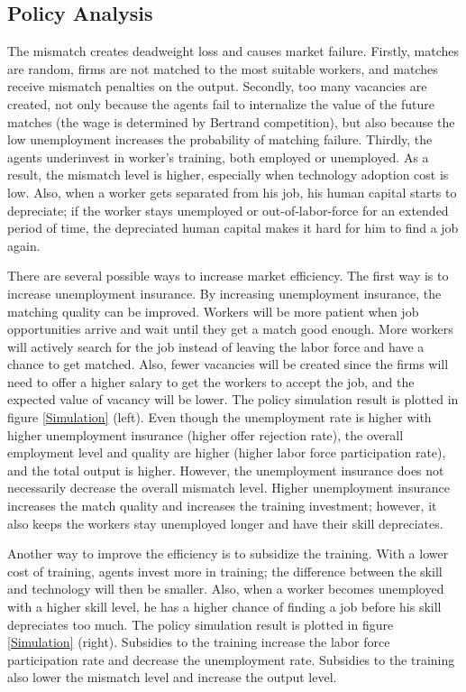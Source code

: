 \documentclass[12pt]{article}
\newcommand{\1}{\mathbb{1}}
\begin{document}
\subsection{Policy Analysis}
The mismatch creates deadweight loss and causes market failure. Firstly, matches are random, firms are not matched to the most suitable workers, and matches receive mismatch penalties on the output. Secondly, too many vacancies are created, not only because the agents fail to internalize the value of the future matches (the wage is determined by Bertrand competition), but also because the low unemployment increases the probability of matching failure. Thirdly, the agents underinvest in worker's training, both employed or unemployed. As a result, the mismatch level is higher, especially when technology adoption cost is low. Also, when a worker gets separated from his job, his human capital starts to depreciate; if the worker stays unemployed or out-of-labor-force for an extended period of time, the depreciated human capital makes it hard for him to find a job again. 

There are several possible ways to increase market efficiency. The first way is to increase unemployment insurance. By increasing unemployment insurance, the matching quality can be improved. Workers will be more patient when job opportunities arrive and wait until they get a match good enough. More workers will actively search for the job instead of leaving the labor force and have a chance to get matched. Also, fewer vacancies will be created since the firms will need to offer a higher salary to get the workers to accept the job, and the expected value of vacancy will be lower. The policy simulation result is plotted in figure \ref{Simulation} (left). Even though the unemployment rate is higher with higher unemployment insurance (higher offer rejection rate), the overall employment level and quality are higher (higher labor force participation rate), and the total output is higher. However, the unemployment insurance does not necessarily decrease the overall mismatch level. Higher unemployment insurance increases the match quality and increases the training investment; however, it also keeps the workers stay unemployed longer and have their skill depreciates. 

Another way to improve the efficiency is to subsidize the training. With a lower cost of training, agents invest more in training; the difference between the skill and technology will then be smaller. Also, when a worker becomes unemployed with a higher skill level, he has a higher chance of finding a job before his skill depreciates too much. The policy simulation result is plotted in figure \ref{Simulation} (right). Subsidies to the training increase the labor force participation rate and decrease the unemployment rate. Subsidies to the training also lower the mismatch level and increase the output level. 
\end{document}
